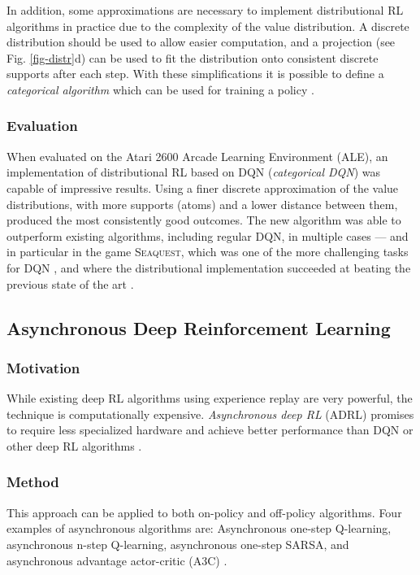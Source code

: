 \documentclass[runningheads]{llncs}
\begin{document}
In addition, some approximations are necessary to implement distributional RL algorithms in practice due to the complexity of the value distribution. A discrete distribution should be used to allow easier computation, and a projection (see Fig. \ref{fig-distr}d) can be used to fit the distribution onto consistent discrete supports after each step. With these simplifications it is possible to define a \textit{categorical algorithm} which can be used for training a policy \cite{bellemare2017distributional}.

\subsubsection{Evaluation}

When evaluated on the Atari 2600 Arcade Learning Environment (ALE), an implementation of distributional RL based on DQN (\textit{categorical DQN}) was capable of impressive results. Using a finer discrete approximation of the value distributions, with more supports (atoms) and a lower distance between them, produced the most consistently good outcomes. The new algorithm was able to outperform existing algorithms, including regular DQN, in multiple cases — and in particular in the game \textsc{Seaquest}, which was one of the more challenging tasks for DQN \cite{mnih2013playing}, and where the distributional implementation succeeded at beating the previous state of the art \cite{bellemare2017distributional}.

\subsection{Asynchronous Deep Reinforcement Learning}

\subsubsection{Motivation}

While existing deep RL algorithms using experience replay are very powerful, the technique is computationally expensive. \textit{Asynchronous deep RL} (ADRL) promises to require less specialized hardware and achieve better performance than DQN or other deep RL algorithms \cite{mnih2016asynchronous}.

\subsubsection{Method}

This approach can be applied to both on-policy and off-policy algorithms.  Four examples of asynchronous algorithms are: Asynchronous one-step Q-learning, asynchronous n-step Q-learning, asynchronous one-step SARSA, and asynchronous advantage actor-critic (A3C) \cite{mnih2016asynchronous}.
\end{document}

